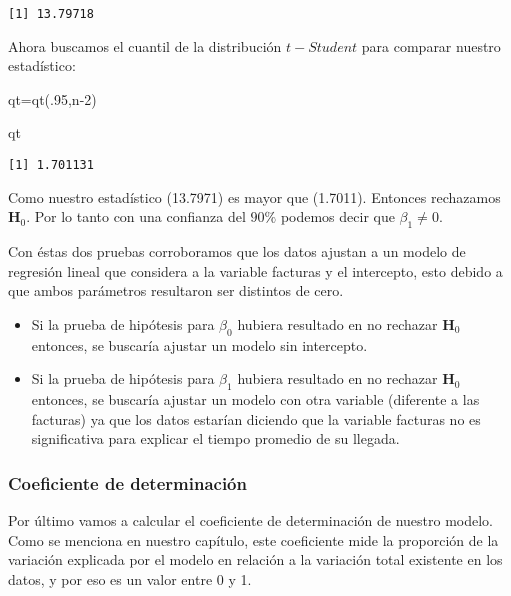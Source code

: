 \documentclass[
  a4paper,
  oneside,
  openany]{book}
\newenvironment{Shaded}{\begin{snugshade}}{\end{snugshade}}
\newcommand{\DecValTok}[1]{\textcolor[rgb]{0.00,0.00,0.81}{#1}}
\newcommand{\FunctionTok}[1]{\textcolor[rgb]{0.00,0.00,0.00}{#1}}
\newcommand{\NormalTok}[1]{#1}
\newcommand{\OtherTok}[1]{\textcolor[rgb]{0.56,0.35,0.01}{#1}}
\begin{document}
\begin{verbatim}
[1] 13.79718
\end{verbatim}

Ahora buscamos el cuantil de la distribución \(t-Student\) para comparar nuestro estadístico:

\begin{Shaded}
\begin{Highlighting}[]
\NormalTok{qt}\OtherTok{=}\FunctionTok{qt}\NormalTok{(.}\DecValTok{95}\NormalTok{,n}\DecValTok{{-}2}\NormalTok{) }

\NormalTok{qt}
\end{Highlighting}
\end{Shaded}

\begin{verbatim}
[1] 1.701131
\end{verbatim}

Como nuestro estadístico (13.7971) es mayor que (1.7011). Entonces rechazamos \(\textbf{H}_0\). Por lo tanto con una confianza del \(90\%\) podemos decir que \(\beta_{1} \neq 0.\)

Con éstas dos pruebas corroboramos que los datos ajustan a un modelo de regresión lineal que considera a la variable facturas y el intercepto, esto debido a que ambos parámetros resultaron ser distintos de cero.

\begin{itemize}
\item
  Si la prueba de hipótesis para \(\beta_{0 }\) hubiera resultado en no rechazar \(\textbf{H}_0\) entonces, se buscaría ajustar un modelo sin intercepto.
\item
  Si la prueba de hipótesis para \(\beta_{1}\) hubiera resultado en no rechazar \(\textbf{H}_0\) entonces, se buscaría ajustar un modelo con otra variable (diferente a las facturas) ya que los datos estarían diciendo que la variable facturas no es significativa para explicar el tiempo promedio de su llegada.
\end{itemize}

\hypertarget{coeficiente-de-determinaciuxf3n-1}{%
\subsubsection*{Coeficiente de determinación}\label{coeficiente-de-determinaciuxf3n-1}}


Por último vamos a calcular el coeficiente de determinación de nuestro modelo. Como se menciona en nuestro capítulo, este coeficiente mide la proporción de la variación explicada por el modelo en relación a la variación total existente en los datos, y por eso es un valor entre 0 y 1.
\end{document}
